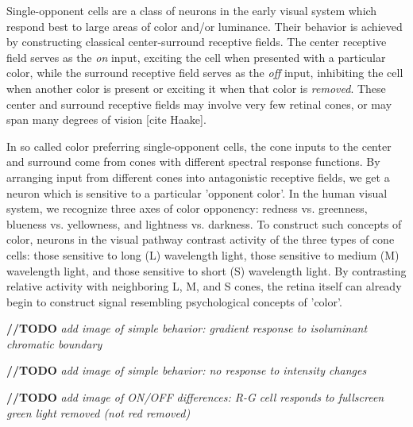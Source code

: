 \documentclass[journal,onecolumn]{IEEEtran}
\begin{document}
Single-opponent cells are a class of neurons in the early visual system which respond best to large areas of color and/or luminance. Their behavior is achieved by constructing classical center-surround receptive fields. The center receptive field serves as the \textit{on} input, exciting the cell when presented with a particular color, while the surround receptive field serves as the \textit{off} input, inhibiting the cell when another color is present or exciting it when that color is \textit{removed}. These center and surround receptive fields may involve very few retinal cones, or may span many degrees of vision [cite Haake].

In so called color preferring single-opponent cells, the cone inputs to the center and surround come from cones with different spectral response functions. By arranging input from different cones into antagonistic  receptive fields, we get a neuron which is sensitive to a particular 'opponent color'. In the human visual system, we recognize three axes of color opponency: redness vs. greenness, blueness vs. yellowness, and lightness vs. darkness. To construct such concepts of color, neurons in the visual pathway contrast activity of the three types of cone cells: those sensitive to long (L) wavelength light, those sensitive to medium (M) wavelength light, and those sensitive to short (S) wavelength light. By contrasting relative activity with neighboring L, M, and S cones, the retina itself can already begin to construct signal resembling psychological concepts of 'color'.

\bigskip

\textbf{//TODO} \textit{add image of simple behavior: gradient response to isoluminant chromatic boundary}

\textbf{//TODO} \textit{add image of simple behavior: no response to intensity changes}

\textbf{//TODO} \textit{add image of ON/OFF differences: R-G cell responds to fullscreen green light removed (not red removed)}

\bigskip
\end{document}

